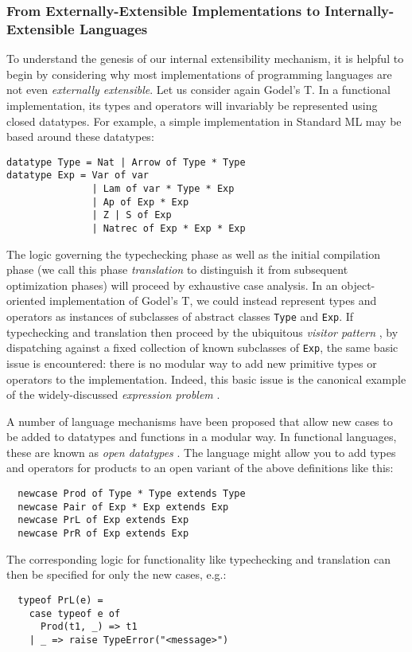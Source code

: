 \subsubsection{From Externally-Extensible Implementations to Internally-Extensible Languages}
To understand the genesis of our internal extensibility mechanism, it is helpful to begin by considering why most implementations of programming languages are not even \emph{externally extensible}. Let us consider again Godel's T. 
In a functional implementation, its types and operators will invariably be represented using {closed} datatypes. For example, a simple implementation in Standard ML may be based around these datatypes:
\begin{lstlisting}
datatype Type = Nat | Arrow of Type * Type
datatype Exp = Var of var 
               | Lam of var * Type * Exp
               | Ap of Exp * Exp 
               | Z | S of Exp 
               | Natrec of Exp * Exp * Exp
\end{lstlisting}

The logic governing the typechecking phase as well as the initial compilation phase (we call this phase \emph{translation} to distinguish it from subsequent optimization phases) will proceed by exhaustive case analysis.
In an object-oriented implementation of Godel's T, we could instead represent types and operators as instances of subclasses of abstract classes \lstinline{Type} and \lstinline{Exp}. If typechecking and translation then proceed by the ubiquitous \emph{visitor pattern} \cite{visitor}, by dispatching against a {fixed} collection of known subclasses of \lstinline{Exp}, the same basic issue is encountered: there is no modular way to add new primitive types or operators to the implementation.
Indeed, this basic issue is the canonical example of the widely-discussed \emph{expression problem} \cite{wadler-expression}.

A number of language mechanisms have been proposed that allow new cases to be added to datatypes and functions  in a modular way. In functional languages, these are known as \emph{open datatypes} \cite{open-datatypes}. The language might allow you to add types and operators for products to an open variant of the above definitions  like this: 
\begin{lstlisting}
  newcase Prod of Type * Type extends Type
  newcase Pair of Exp * Exp extends Exp
  newcase PrL of Exp extends Exp
  newcase PrR of Exp extends Exp
\end{lstlisting}

The corresponding logic for functionality like typechecking and translation can then be specified for only the new cases, e.g.:
\begin{lstlisting}
  typeof PrL(e) = 
    case typeof e of 
      Prod(t1, _) => t1 
    | _ => raise TypeError("<message>")
\end{lstlisting}

